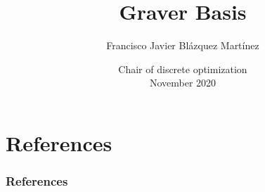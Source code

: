 \documentclass[xcolor={dvipsnames}]{beamer}
\title{Graver Basis}
\author{Francisco Javier Blázquez Martínez}
\institute[EPFL]{\normalsize

    \begin{figure}[htb]
        \centering
        \texttt{[image: images/logos/epfl\_logo.png]}
    \end{figure}
}
\date{\small Chair of discrete optimization \\ November 2020}
\begin{document}
    \frame{\titlepage}


    \section{References}
    \begin{frame}[allowframebreaks]
        \frametitle{References}
        \nocite{*}
        \printbibliography
    \end{frame}
\end{document}
